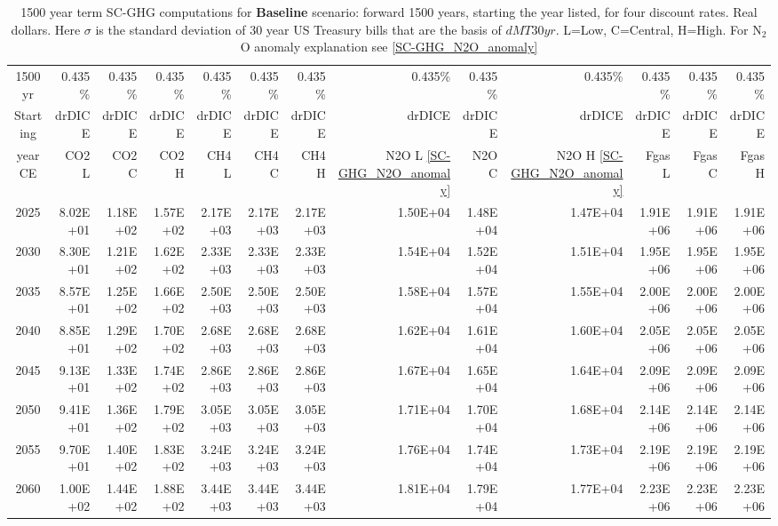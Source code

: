 \documentclass{article}
\begin{document}
\begin{table}
   \caption{1500 year term SC-GHG computations for \textbf{Baseline} scenario: forward 1500 years, starting the year listed, for four discount rates. Real dollars. Here $\sigma$ is the standard deviation of 30 year US Treasury bills that are the basis of $dMT30yr$. L=Low, C=Central, H=High. For N$_2$O anomaly explanation see \ref{SC-GHG_N2O_anomaly}} 
\label{PVs_1500_yearSCC_B2}
\small
\begin{tabular}{crrr|rrr|rrr|rrr}
1500 yr  & 0.435\%  & 0.435\%  & 0.435\%  & 0.435\%  & 0.435\%  & 0.435\%  & 0.435\%  & 0.435\%  & 0.435\%  & 0.435\%  & 0.435\%  & 0.435\%  \\
Starting & drDICE   & drDICE   & drDICE   & drDICE   & drDICE   & drDICE   & drDICE   & drDICE   & drDICE   & drDICE   & drDICE   & drDICE   \\
year CE  & CO2 L    & CO2 C    & CO2 H    & CH4 L    & CH4 C    & CH4 H    & N2O L \ref{SC-GHG_N2O_anomaly}     & N2O C      & N2O H \ref{SC-GHG_N2O_anomaly}    & Fgas L   & Fgas C   & Fgas H   \\
2025     & 8.02E+01 & 1.18E+02 & 1.57E+02 & 2.17E+03 & 2.17E+03 & 2.17E+03 & 1.50E+04 & 1.48E+04 & 1.47E+04 & 1.91E+06 & 1.91E+06 & 1.91E+06 \\
2030     & 8.30E+01 & 1.21E+02 & 1.62E+02 & 2.33E+03 & 2.33E+03 & 2.33E+03 & 1.54E+04 & 1.52E+04 & 1.51E+04 & 1.95E+06 & 1.95E+06 & 1.95E+06 \\
2035     & 8.57E+01 & 1.25E+02 & 1.66E+02 & 2.50E+03 & 2.50E+03 & 2.50E+03 & 1.58E+04 & 1.57E+04 & 1.55E+04 & 2.00E+06 & 2.00E+06 & 2.00E+06 \\
2040     & 8.85E+01 & 1.29E+02 & 1.70E+02 & 2.68E+03 & 2.68E+03 & 2.68E+03 & 1.62E+04 & 1.61E+04 & 1.60E+04 & 2.05E+06 & 2.05E+06 & 2.05E+06 \\
2045     & 9.13E+01 & 1.33E+02 & 1.74E+02 & 2.86E+03 & 2.86E+03 & 2.86E+03 & 1.67E+04 & 1.65E+04 & 1.64E+04 & 2.09E+06 & 2.09E+06 & 2.09E+06 \\
2050     & 9.41E+01 & 1.36E+02 & 1.79E+02 & 3.05E+03 & 3.05E+03 & 3.05E+03 & 1.71E+04 & 1.70E+04 & 1.68E+04 & 2.14E+06 & 2.14E+06 & 2.14E+06 \\
2055     & 9.70E+01 & 1.40E+02 & 1.83E+02 & 3.24E+03 & 3.24E+03 & 3.24E+03 & 1.76E+04 & 1.74E+04 & 1.73E+04 & 2.19E+06 & 2.19E+06 & 2.19E+06 \\
2060     & 1.00E+02 & 1.44E+02 & 1.88E+02 & 3.44E+03 & 3.44E+03 & 3.44E+03 & 1.81E+04 & 1.79E+04 & 1.77E+04 & 2.23E+06 & 2.23E+06 & 2.23E+06 \\

\end{tabular}
\end{table}
\end{document}
